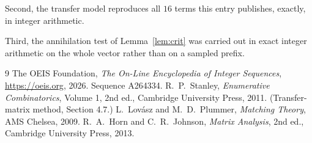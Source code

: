 \documentclass[11pt,a4paper]{article}
\theoremstyle{plain}
\theoremstyle{definition}
\begin{document}
Second, the transfer model reproduces all $16$ terms this entry publishes, exactly, in
integer arithmetic.

Third, the annihilation test of Lemma~\ref{lem:crit} was carried out in exact integer
arithmetic on the whole vector rather than on a sampled prefix.

\begin{thebibliography}{9}
 The OEIS Foundation, \emph{The On-Line Encyclopedia of Integer
Sequences}, \url{https://oeis.org}, 2026. Sequence A264334.
 R.~P.~Stanley, \emph{Enumerative Combinatorics}, Volume 1, 2nd ed.,
Cambridge University Press, 2011. (Transfer-matrix method, Section 4.7.)
 L.~Lov\'asz and M.~D.~Plummer, \emph{Matching Theory}, AMS Chelsea, 2009.
 R.~A.~Horn and C.~R.~Johnson, \emph{Matrix Analysis}, 2nd ed., Cambridge
University Press, 2013.
\end{thebibliography}
\end{document}
